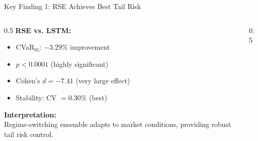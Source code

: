\documentclass[aspectratio=169,11pt]{beamer}
\begin{document}
\begin{frame}{Key Finding 1: RSE Achieves Best Tail Risk}
\begin{columns}
\begin{column}{0.5\textwidth}
\textbf{RSE vs. LSTM:}
\begin{itemize}
    \item CVaR$_{95}$: $\mathbf{-3.29\%}$ improvement
    \item $p < 0.0001$ (highly significant)
    \item Cohen's $d = -7.41$ (very large effect)
    \item Stability: CV $= 0.30\%$ (best)
\end{itemize}

\vspace{0.3cm}
\textbf{Interpretation:}\\
Regime-switching ensemble adapts to market conditions, providing robust tail risk control.
\end{column}
\begin{column}{0.5\textwidth}
\end{column}
\end{columns}
\end{frame}
\end{document}
